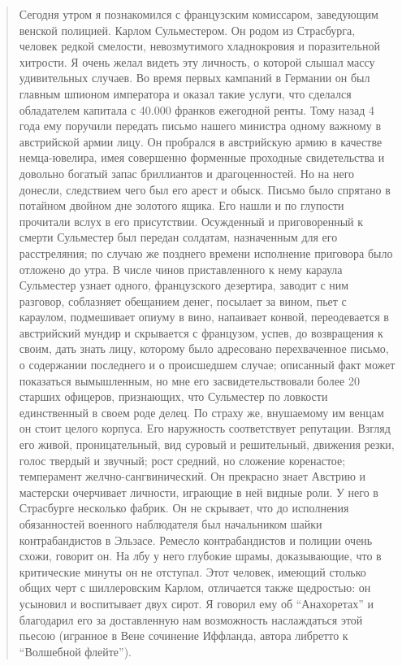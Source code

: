 \documentclass[
  oneside,
  12pt,
  titlepage]{book}
\begin{document}
\begin{quote}
Сегодня утром я познакомился с французским комиссаром, заведующим венской полицией. Карлом Сульместером. Он родом из Страсбурга, человек редкой смелости, невозмутимого хладнокровия и поразительной хитрости. Я очень желал видеть эту личность, о которой слышал массу удивительных случаев. Во время первых кампаний в Германии он был главным шпионом императора и оказал такие услуги, что сделался обладателем капитала с 40.000 франков ежегодной ренты. Тому назад 4 года ему поручили передать письмо нашего министра одному важному в австрийской армии лицу. Он пробрался в австрийскую армию в качестве немца-ювелира, имея совершенно форменные проходные свидетельства и довольно богатый запас бриллиантов и драгоценностей. Но на него донесли, следствием чего был его арест и обыск. Письмо было спрятано в потайном двойном дне золотого ящика. Его нашли и по глупости прочитали вслух в его присутствии. Осужденный и приговоренный к смерти Сульместер был передан солдатам, назначенным для его расстреляния; по случаю же позднего времени исполнение приговора было отложено до утра. В числе чинов приставленного к нему караула Сульместер узнает одного, французского дезертира, заводит с ним разговор, соблазняет обещанием денег, посылает за вином, пьет с караулом, подмешивает опиуму в вино, напаивает конвой, переодевается в австрийский мундир и скрывается с французом, успев, до возвращения к своим, дать знать лицу, которому было адресовано перехваченное письмо, о содержании последнего и о происшедшем случае; описанный факт может показаться вымышленным, но мне его засвидетельствовали более 20 старших офицеров, признающих, что Сульместер по ловкости единственный в своем роде делец. По страху же, внушаемому им венцам он стоит целого корпуса. Его наружность соответствует репутации. Взгляд его живой, проницательный, вид суровый и решительный, движения резки, голос твердый и звучный; рост средний, но сложение коренастое; темперамент желчно-сангвинический. Он прекрасно знает Австрию и мастерски очерчивает личности, играющие в ней видные роли. У него в Страсбурге несколько фабрик. Он не скрывает, что до исполнения обязанностей военного наблюдателя был начальником шайки контрабандистов в Эльзасе. Ремесло контрабандистов и полиции очень схожи, говорит он. На лбу у него глубокие шрамы, доказывающие, что в критические минуты он не отступал. Этот человек, имеющий столько общих черт с шиллеровским Карлом, отличается также щедростью: он усыновил и воспитывает двух сирот. Я говорил ему об ``Анахоретах'' и благодарил его за доставленную нам возможность наслаждаться этой пьесою (игранное в Вене сочинение Иффланда, автора либретто к ``Волшебной флейте'').\\

\end{quote}
\end{document}
